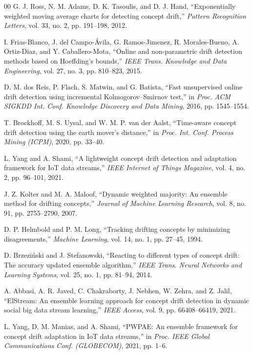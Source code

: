 \documentclass[conference]{IEEEtran}
\begin{document}
\begin{thebibliography}{00}
G. J. Ross, N. M. Adams, D. K. Tasoulis, and D. J. Hand, ``Exponentially weighted
moving average charts for detecting concept drift,'' \emph{Pattern Recognition
Letters}, vol. 33, no. 2, pp. 191--198, 2012.

I. Frias-Blanco, J. del Campo-\'Avila, G. Ramos-Jimenez, R. Morales-Bueno, A.
Ortiz-Diaz, and Y. Caballero-Mota, ``Online and non-parametric drift detection
methods based on Hoeffding's bounds,'' \emph{IEEE Trans. Knowledge and Data
Engineering}, vol. 27, no. 3, pp. 810--823, 2015.

D. M. dos Reis, P. Flach, S. Matwin, and G. Batista, ``Fast unsupervised online
drift detection using incremental Kolmogorov--Smirnov test,'' in \emph{Proc. ACM
SIGKDD Int. Conf. Knowledge Discovery and Data Mining}, 2016, pp. 1545--1554.

T. Brockhoff, M. S. Uysal, and W. M. P. van der Aalst, ``Time-aware concept drift
detection using the earth mover's distance,'' in \emph{Proc. Int. Conf. Process
Mining (ICPM)}, 2020, pp. 33--40.

L. Yang and A. Shami, ``A lightweight concept drift detection and adaptation
framework for IoT data streams,'' \emph{IEEE Internet of Things Magazine}, vol. 4,
no. 2, pp. 96--101, 2021.

J. Z. Kolter and M. A. Maloof, ``Dynamic weighted majority: An ensemble method for
drifting concepts,'' \emph{Journal of Machine Learning Research}, vol. 8, no. 91,
pp. 2755--2790, 2007.

D. P. Helmbold and P. M. Long, ``Tracking drifting concepts by minimizing
disagreements,'' \emph{Machine Learning}, vol. 14, no. 1, pp. 27--45, 1994.

D. Brzezi\'nski and J. Stefanowski, ``Reacting to different types of concept drift:
The accuracy updated ensemble algorithm,'' \emph{IEEE Trans. Neural Networks and
Learning Systems}, vol. 25, no. 1, pp. 81--94, 2014.

A. Abbasi, A. R. Javed, C. Chakraborty, J. Nebhen, W. Zehra, and Z. Jalil,
``ElStream: An ensemble learning approach for concept drift detection in dynamic
social big data stream learning,'' \emph{IEEE Access}, vol. 9, pp. 66408--66419,
2021.

L. Yang, D. M. Manias, and A. Shami, ``PWPAE: An ensemble framework for concept
drift adaptation in IoT data streams,'' in \emph{Proc. IEEE Global Communications
Conf. (GLOBECOM)}, 2021, pp. 1--6.


\end{thebibliography}
\end{document}
